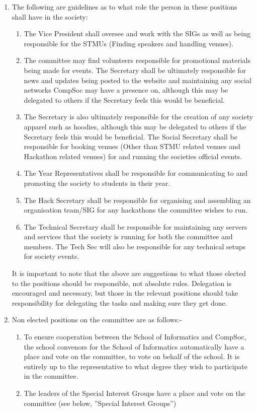 \documentclass{article}
\begin{document}
\begin {enumerate}
  \item The following are guidelines as to what role the person in these positions shall have in the society:
    \begin{enumerate}
      \item The Vice President shall oversee and work with the SIGs as well as
        being responsible for the STMUs (Finding speakers and handling venues).
      \item The committee may find volunteers responsible for promotional materials
        being made for events. The Secretary shall be ultimately
        responsible for news and updates being posted to the website and
        maintaining any social networks CompSoc may have a presence on,
        although this may be delegated to others if the Secretary feels this
        would be beneficial.
      \item The Secretary is also ultimately responsible for the creation of any
        society apparel such as hoodies, although this may be delegated to others
        if the Secretary feels this would be beneficial. The Social Secretary
        shall be responsible for booking venues (Other than STMU related venues 
        and Hackathon related venues) for and running the societies
        official events.
      \item The Year Representatives shall be responsible for communicating to
        and promoting the society to students in their year.
      \item The Hack Secretary shall be responsible for organising and assembling 
        an organisation team/SIG for any hackathons the committee wishes to run.
      \item The Technical Secretary shall be responsible for maintaining any servers
        and services that the society is running for both the committee and members.
        The Tech Sec will also be responsible for any technical setups for society events.
    \end{enumerate}

    It is important to note that the above are suggestions to what those elected
    to the positions should be responsible, not absolute rules. Delegation is
    encouraged and necessary, but those in the relevant positions should take
    responsibility for delegating the tasks and making sure they get done.
    
    \item Non elected positions on the committee are as follows:-
      \begin{enumerate}
        \item To ensure cooperation between the School of Informatics and CompSoc,
          the school convenors for the School of Informatics automatically
          have a place and vote on the committee, to vote on behalf of the school.
          It is entirely up to the representative to what degree they wish
          to participate in the committee.
        \item The leaders of the Special Interest Groups have a place and vote on
          the committee (see below, ”Special Interest Groups”)
      \end{enumerate}


\end{enumerate}
\end{document}
